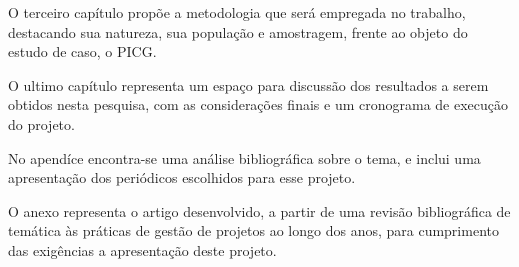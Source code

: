 O terceiro capítulo propõe a metodologia que será empregada no trabalho, destacando sua natureza, sua população e amostragem, frente ao objeto do estudo de caso, o PICG.

O ultimo capítulo representa um espaço para discussão dos resultados a serem obtidos nesta pesquisa, com as considerações finais e um cronograma de execução do projeto.

No apendíce encontra-se uma análise bibliográfica sobre o tema, e inclui uma apresentação dos periódicos escolhidos para esse projeto.

O anexo representa o artigo desenvolvido, a partir de uma revisão bibliográfica de temática às práticas de gestão de projetos ao longo dos anos, para cumprimento das exigências a apresentação deste projeto.
